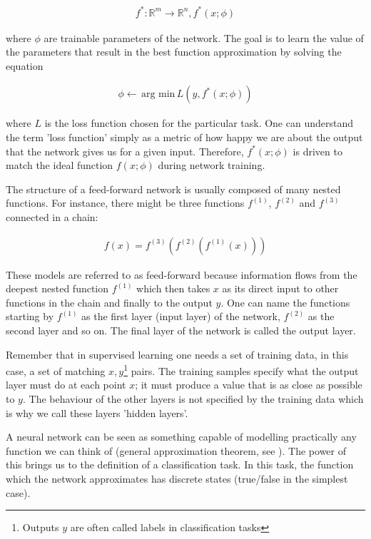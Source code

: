 \begin{gather}
f^*: \mathbb{R}^m \rightarrow \mathbb{R}^n, f^*(x;\phi)
\end{gather}

\noindent where $ \phi $ are trainable parameters of the network. The goal is to learn the value of the parameters that result in the best function approximation by solving the equation \cite{santiago}

\begin{gather}
\phi \leftarrow \, \text{arg min} \, L(y, f^*(x;\phi))
\end{gather}

\noindent where $ L $ is the loss function chosen for the particular task. One can understand the term 'loss function' simply as a metric of how happy we are about the output that the network gives us for a given input. Therefore, $f^*(x;\phi)$ is driven to match the ideal function $f(x;\phi)$ during network training. 

The structure of a feed-forward network is usually composed of many nested functions. For instance, there might be three functions $f^{(1)}$, $f^{(2)}$ and $f^{(3)}$ connected in a chain: \cite{santiago}

\begin{gather}
f(x) = f^{(3)}(f^{(2)}(f^{(1)}(x)))
\end{gather}

These models are referred to as feed-forward because information flows from the deepest nested function $f^{(1)}$ which then takes $ x $ as its direct input to other functions in the chain and finally to the output $ y $. One can name the functions starting by $f^{(1)}$ as the first layer (input layer) of the network, $f^{(2)}$ as the second layer and so on. The final layer of the network is called the output layer. \cite{santiago}

Remember that in supervised learning one needs a set of training data, in this case, a set of matching $ x, y $\footnote{Outputs $ y $ are often called labels in classification tasks}  pairs. The training samples specify what the output layer must do at each point $ x $; it must produce a value that is as close as possible to $ y $. The behaviour of the other layers is not specified by the training data which is why we call these layers 'hidden layers'.

A neural network can be seen as something capable of modelling practically any function we can think of (general approximation theorem, see \cite{goodfellow}). The power of this brings us to the definition of a classification task. In this task, the function which the network approximates has discrete states (true/false in the simplest case). 

